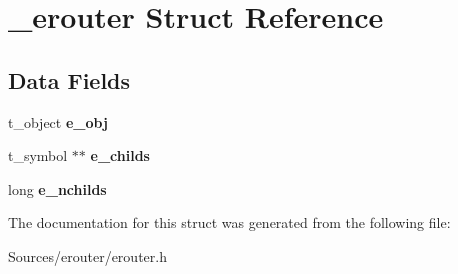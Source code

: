 \hypertarget{struct__erouter}{\section{\-\_\-erouter Struct Reference}
\label{struct__erouter}
}
\subsection*{Data Fields}
\begin{DoxyCompactItemize}
\item 
\hypertarget{struct__erouter_a337dd8dd1771ebe57e90886d4fdfe92d}{t\-\_\-object {\bfseries e\-\_\-obj}}\label{struct__erouter_a337dd8dd1771ebe57e90886d4fdfe92d}

\item 
\hypertarget{struct__erouter_aef3d4c537a87fdd1319fb505dc77f8c3}{t\-\_\-symbol $\ast$$\ast$ {\bfseries e\-\_\-childs}}\label{struct__erouter_aef3d4c537a87fdd1319fb505dc77f8c3}

\item 
\hypertarget{struct__erouter_aae6cef9e2d4de46e690ad868953d0923}{long {\bfseries e\-\_\-nchilds}}\label{struct__erouter_aae6cef9e2d4de46e690ad868953d0923}

\end{DoxyCompactItemize}


The documentation for this struct was generated from the following file\-:\begin{DoxyCompactItemize}
\item 
Sources/erouter/erouter.\-h\end{DoxyCompactItemize}
